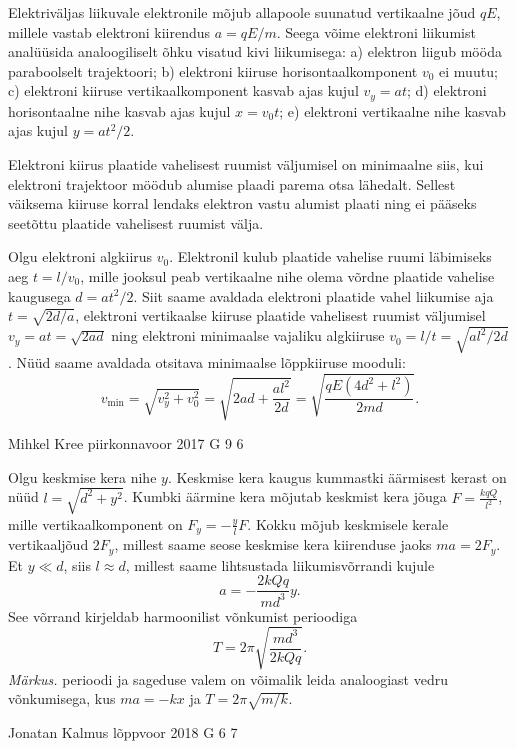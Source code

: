 \documentclass[11pt, twoside]{article}
\begin{document}
{{\ifSolution
Elektriväljas liikuvale elektronile mõjub allapoole suunatud vertikaalne jõud $qE$, millele vastab elektroni kiirendus $a=qE/m$. Seega võime elektroni liikumist analüüsida analoogiliselt õhku visatud kivi liikumisega: a) elektron liigub mööda paraboolselt trajektoori; b) elektroni kiiruse horisontaalkomponent $v_0$ ei muutu; c) elektroni kiiruse vertikaalkomponent kasvab ajas kujul $v_y=at$; d) elektroni horisontaalne nihe kasvab ajas kujul $x=v_0t$; e) elektroni vertikaalne nihe kasvab ajas kujul $y=at^2/2$.

Elektroni kiirus plaatide vahelisest ruumist väljumisel on minimaalne siis, kui elektroni trajektoor möödub alumise plaadi parema otsa lähedalt. Sellest väiksema kiiruse korral lendaks elektron vastu alumist plaati ning ei pääseks seetõttu plaatide vahelisest ruumist välja.

Olgu elektroni algkiirus $v_0$. Elektronil kulub plaatide vahelise ruumi läbimiseks aeg $t=l/v_0$, mille jooksul peab vertikaalne nihe olema võrdne plaatide vahelise kaugusega $d=at^2/2$. Siit saame avaldada elektroni plaatide vahel liikumise aja $t=\sqrt{2d/a}$, elektroni vertikaalse kiiruse plaatide vahelisest ruumist väljumisel $v_y=at=\sqrt{2ad}$ ning elektroni minimaalse vajaliku algkiiruse $v_0=l/t=\sqrt{al^2/2d}$. Nüüd saame avaldada otsitava minimaalse lõppkiiruse mooduli:
\[
v_\mathrm{min}=\sqrt{v_y^2+v_0^2}=\sqrt{2ad+\frac{al^2}{2d}}=\sqrt{\frac{qE\left(4d^2+l^2\right)}{2md}}.
\]
\fi
}

{Mihkel Kree} %
{piirkonnavoor} %
{2017} %
{G 9} %
{6} %
{

\ifSolution
Olgu keskmise kera nihe $y$. Keskmise kera kaugus kummastki äärmisest kerast on nüüd $l=\sqrt{d^2+y^2}$. Kumbki äärmine kera mõjutab keskmist kera jõuga $F=\frac{kqQ}{l^2}$, mille vertikaalkomponent on $F_y=-\frac{y}{l}F$. Kokku mõjub keskmisele kerale vertikaaljõud $2F_y$, millest saame seose keskmise kera kiirenduse jaoks $ma=2F_y$. Et $y\ll d$, siis $l\approx d$, millest saame lihtsustada liikumisvõrrandi kujule
\[
a=-\frac{2kQq}{md^3}y.
\]
See võrrand kirjeldab harmoonilist võnkumist perioodiga 
\[ T = 2\pi \sqrt{\frac{md^3}{2kQq}}.\]
{\em Märkus.} perioodi ja sageduse valem on võimalik leida analoogiast vedru võnkumisega, kus $ma = -kx$ ja $T=2\pi \sqrt{m/k}$.
\fi
}

{Jonatan Kalmus} %
{lõppvoor} %
{2018} %
{G 6} %
{7} %
{

}}
\end{document}
